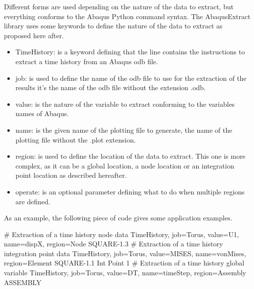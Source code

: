 Different forms are used depending on the nature of the data to extract,
but everything conforms to the Abaqus Python command syntax. The \textsf{AbaqusExtract}
library uses some keywords to define the nature of the data to extract
as proposed here after.
\begin{itemize}
\item \textsf{TimeHistory}: is a keyword defining that the line contains
the instructions to extract a time history from an Abaqus \textsf{odb}
file.
\item \textsf{job}: is used to define the name of the odb file to use for
the extraction of the results \ie it's the name of the \textsf{odb}
file without the extension \textsf{.odb}.
\item \textsf{value}: is the nature of the variable to extract conforming
to the variables names of Abaqus.
\item \textsf{name}: is the given name of the plotting file to generate,
\ie the name of the plotting file without the \textsf{.plot} extension.
\item \textsf{region}: is used to define the location of the data to extract.
This one is more complex, as it can be a global location, a node location
or an integration point location as described hereafter.
\item \textsf{operate}: is an optional parameter defining what to do when
multiple regions are defined.
\end{itemize}
As an example, the following piece of code gives some application
examples.

\begin{PythonListing}
# Extraction of a time history node data
TimeHistory, job=Torus, value=U1, name=dispX, region=Node SQUARE-1.3
# Extraction of a time history integration point data
TimeHistory, job=Torus, value=MISES, name=vonMises, region=Element SQUARE-1.1 Int Point 1
# Extraction of a time history global variable
TimeHistory, job=Torus, value=DT, name=timeStep, region=Assembly ASSEMBLY
\end{PythonListing}

